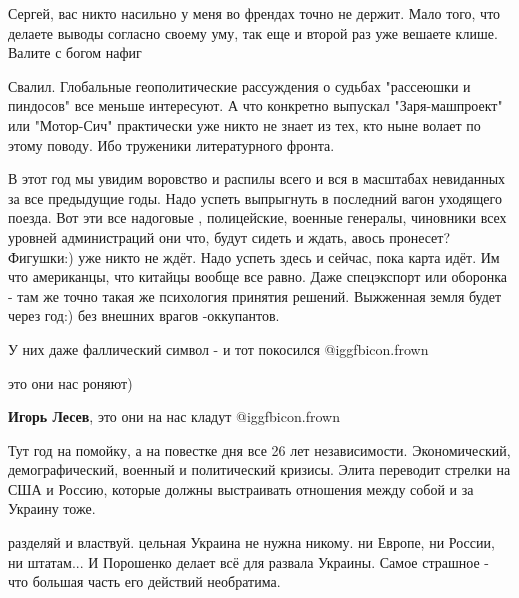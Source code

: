 \begin{itemize}
\begin{itemize} %
Сергей, вас никто насильно у меня во френдах точно не держит. Мало того, что
делаете выводы согласно своему уму, так еще и второй раз уже вешаете клише.
Валите с богом нафиг


Свалил. Глобальные геополитические рассуждения о судьбах "рассеюшки и пиндосов"
все меньше интересуют. А что конкретно выпускал "Заря-машпроект" или
"Мотор-Сич" практически уже никто не знает из тех, кто ныне волает по этому
поводу. Ибо труженики литературного фронта.

\end{itemize} %


В этот год мы увидим воровство и распилы всего и вся в масштабах невиданных за
все предыдущие годы. Надо успеть выпрыгнуть в последний вагон уходящего поезда.
Вот эти все надоговые , полицейские, военные генералы, чиновники всех уровней
администраций они что, будут сидеть и ждать, авось пронесет? Фигушки:) уже
никто не ждёт. Надо успеть здесь и сейчас, пока карта идёт. Им что американцы,
что китайцы вообще все равно. Даже спецэкспорт или оборонка - там же точно
такая же психология принятия решений. Выжженная земля будет через год:) без
внешних врагов -оккупантов.

У них даже фаллический символ - и тот покосился  @igg{fbicon.frown} 

\begin{itemize} %
это они нас роняют)

\textbf{Игорь Лесев}, это они на нас кладут  @igg{fbicon.frown} 
\end{itemize} %


Тут год на помойку, а на повестке дня все 26 лет независимости. Экономический,
демографический, военный и политический кризисы. Элита переводит стрелки на США
и Россию, которые должны выстраивать отношения между собой и за Украину тоже.


разделяй и властвуй. цельная Украина не нужна никому. ни Европе, ни России, ни
штатам... И Порошенко делает всё для развала Украины. Самое страшное - что
большая часть его действий необратима.

\end{itemize} %
